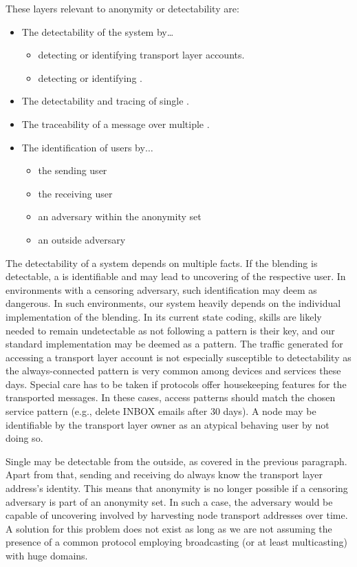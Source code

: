 These layers relevant to anonymity or detectability are:
\begin{itemize}
	\item The detectability of the system by\ldots
	\begin{itemize}
		\item detecting or identifying transport layer accounts.
		\item detecting or identifying \VortexNodes{}.
	\end{itemize}
	\item The detectability and tracing of single \VortexMessages.
	\item The traceability of a message over multiple \VortexNodes{}.
	\item The identification of \MessageVortex{} users by$\ldots$
	\begin{itemize}
		\item the sending \MessageVortex{} user
		\item the receiving \MessageVortex{} user
		\item an adversary within the anonymity set
		\item an outside adversary
	\end{itemize}
\end{itemize} 

The detectability of a system depends on multiple facts. If the blending is detectable, a \VortexNode{} is identifiable and may lead to uncovering of the respective user. In environments with a censoring adversary, such identification may deem as dangerous. In such environments, our system heavily depends on the individual implementation of the blending. In its current state coding, skills are likely needed to remain undetectable as not following a pattern is their key, and our standard implementation may be deemed as a pattern. The traffic generated for accessing a transport layer account is not especially susceptible to detectability as the always-connected pattern is very common among devices and services these days. Special care has to be taken if protocols offer housekeeping features for the transported messages. In these cases, access patterns should match the chosen service pattern (e.g., delete INBOX emails after 30 days). A node may be identifiable by the transport layer owner as an atypical behaving user by not doing so.

Single \VortexMessages{} may be detectable from the outside, as covered in the previous paragraph. Apart from that, sending and receiving \VortexNodes{} do always know the transport layer address's identity. This means that anonymity is no longer possible if a censoring adversary is part of an anonymity set. In such a case, the adversary would be capable of uncovering involved \VortexNodes{} by harvesting node transport addresses over time. A solution for this problem does not exist as long as we are not assuming the presence of a common protocol employing broadcasting (or at least multicasting) with huge domains.

